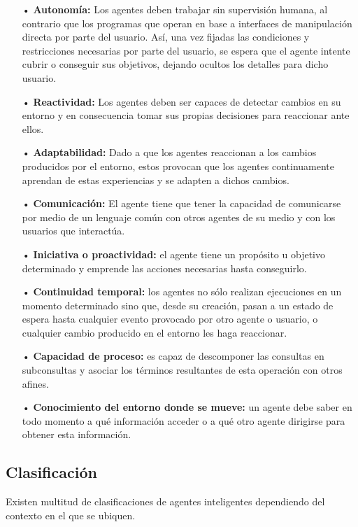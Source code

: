 \begin{itemize}
\item[•] {\bf Autonomía:} Los agentes deben trabajar sin supervisión humana, al contrario que los programas que operan en base a interfaces de manipulación directa por parte del usuario. Así, una vez fijadas las condiciones y restricciones necesarias por parte del usuario, se espera que el agente intente cubrir o conseguir sus objetivos, dejando ocultos los detalles para dicho usuario.

\item[•] {\bf Reactividad:} Los agentes deben ser capaces de detectar cambios en su entorno y en consecuencia tomar sus propias decisiones para reaccionar ante ellos.

\item[•] {\bf Adaptabilidad:} Dado a que los agentes reaccionan a los cambios producidos por el entorno, estos provocan que los agentes continuamente aprendan de estas experiencias y se adapten a dichos cambios.

\item[•] {\bf Comunicación:} El agente tiene que tener la capacidad de comunicarse por medio de un lenguaje común con otros agentes de su medio y con los usuarios que interactúa.

\item[•] {\bf Iniciativa o proactividad:} el agente tiene un propósito u objetivo determinado y emprende las acciones necesarias hasta conseguirlo.

\item[•] {\bf Continuidad temporal:} los agentes no sólo realizan ejecuciones en un momento determinado sino que, desde su creación, pasan a un estado de espera hasta cualquier evento provocado por otro agente o usuario, o cualquier cambio producido en el entorno les haga reaccionar. 

\item[•] {\bf Capacidad de proceso:} es capaz de descomponer las consultas en subconsultas y asociar los términos resultantes de esta operación con otros afines.

\item[•] {\bf Conocimiento del entorno donde se mueve:} un agente debe saber en todo momento a qué información acceder o a qué otro agente dirigirse para obtener esta información.

\end{itemize}

\subsection{Clasificación}
Existen multitud de clasificaciones de agentes inteligentes dependiendo del contexto en el que se ubiquen.

